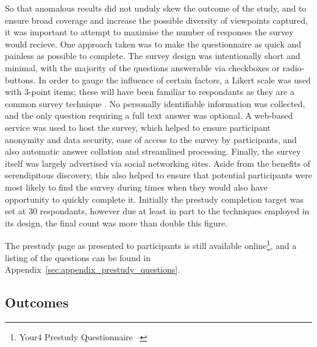 So that anomalous results did not unduly skew the outcome of the study, and to ensure broad coverage and increase the possible diversity of viewpoints captured, it was important to attempt to maximise the number of responses the survey would recieve.
One approach taken was to make the questionnaire as quick and painless as possible to complete.
The survey design was intentionally short and minimal, with the majority of the questions answerable via checkboxes or radio-buttons.
In order to gauge the influence of certain factors, a Likert scale was used with 3-point items; these will have been familiar to respondants as they are a common survey technique \citep{trochim2007}.
No personally identifiable information was collected, and the only question requiring a full text answer was optional. %
A web-based service was used to host the survey, which helped to ensure participant anonymity and data security, ease of access to the survey by participants, and also automatic answer collation and streamlined processing.
Finally, the survey itself was largely advertised via social networking sites. Aside from the benefits of serendipitous discovery, this also helped to ensure that potential participants were most likely to find the survey during times when they would also have opportunity to quickly complete it.
Initially the prestudy completion target was set at 30 respondants, however due at least in part to the techniques employed in its design, the final count was more than double this figure. %

The prestudy page as presented to participants is still available online\footnote{Your4 Prestudy Questionnaire -- }, and a listing of the questions can be found in Appendix~\ref{sec:appendix_prestudy_questions}. 


\subsection{Outcomes}

